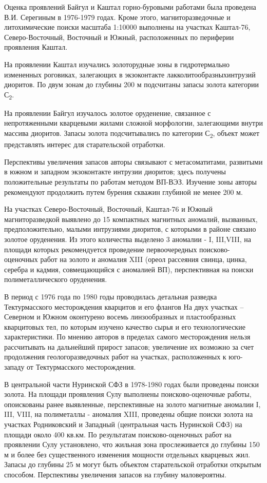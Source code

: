 \begin{multicols}{2}
Оценка проявлений Байгул и Каштал горно-буровыми работами была проведена
В.И. Серегиным в 1976-1979 годах. Кроме этого, магниторазведочные и
литохимические поиски масштаба 1:10000 выполнены на участках Каштал-76,
Северо-Восточный, Восточный и Южный, расположенных по периферии
проявления Каштал.

На проявлении Каштал изучались золоторудные зоны в гидротермально
измененных роговиках, залегающих в экзоконтакте
лакколитообразныхинтрузий диоритов. По двум зонам до глубины 200 м
подсчитаны запасы золота категории С\textsubscript{2}.

На проявлении Байгул изучалось золотое оруденение, связанное с
непротяженными кварцевыми жилами сложной морфологии, залегающими внутри
массива диоритов. Запасы золота подсчитывались по категории
С\textsubscript{2}, объект может представлять интерес для старательской
отработки.

Перспективы увеличения запасов авторы связывают с метасоматитами,
развитыми в южном и западном экзоконтакте интрузии диоритов; здесь
получены положительные результаты по работам методом ВП-ВЭЗ. Изучение
зоны авторы рекомендуют продолжить путем бурения скважин глубиной не
менее 200 м.

На участках Северо-Восточный, Восточный, Каштал-76 и Южный
магниторазведкой выявлено до 15 компактных магнитных аномалий,
вызванных, предположительно, малыми интрузиями диоритов, с которыми в
районе связано золотое оруденения. Из этого количества выделено 3
аномалии - I, III,VIII, на площади которых рекомендуется проведение
первоочередных поисково-оценочных работ на золото и аномалия XIII (ореол
рассеяния свинца, цинка, серебра и кадмия, совмещающийся с аномалией
ВП), перспективная на поиски полиметаллического оруденения.

В период с 1976 года по 1980 годы проводилась детальная разведка
Тектурмасского месторождения кварцитов и его флангов На двух участках --
Северном и Южном оконтурено восемь линзообразных и пластообразных
кварцитовых тел, по которым изучено качество сырья и его технологические
характеристики. По мнению авторов в пределах самого месторождения нельзя
рассчитывать на дальнейший прирост запасов; увеличение их возможно за
счет продолжения геологоразведочных работ на участках, расположенных к
юго-западу от Тектурмасского месторождения.

В центральной части Нуринской СФЗ в 1978-1980 годах были проведены
поиски золота. На площади проявления Сулу выполнены поисково-оценочные
работы, опоискованы ранее выявленные, перспективные на золото магнитные
аномалии I, III, VIII, на полиметаллы - аномалия XIII, проведены общие
поиски золота на участках Родниковский и Западный (центральная часть
Нуринской СФЗ) на площади около 400 кв.км. По результатам
поисково-оценочных работ на проявлении Сулу установлено, что жильная
зона прослеживается до глубины 150 м и более без существенного изменения
мощности отдельных кварцевых жил. Запасы до глубины 25 м могут быть
объектом старательской отработки открытым способом. Перспективы
увеличения запасов на глубину маловероятны.


\end{multicols}
